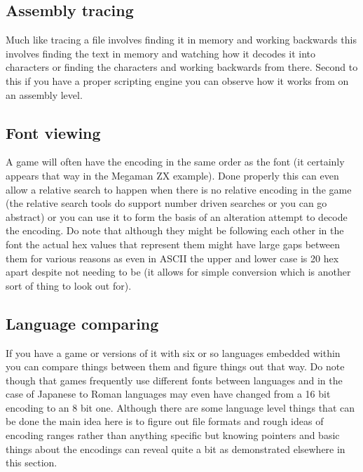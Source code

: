 \documentclass[
]{book}
\begin{document}
\hypertarget{assembly-tracing}{%
\subsection{Assembly tracing}\label{assembly-tracing}}

Much like tracing a file involves finding it in memory and working backwards this involves finding the text in memory and watching how it decodes it into characters or finding the characters and working backwards from there. Second to this if you have a proper scripting engine you can observe how it works from on an assembly level.

\hypertarget{font-viewing}{%
\subsection{Font viewing}\label{font-viewing}}

A game will often have the encoding in the same order as the font (it certainly appears that way in the Megaman ZX example). Done properly this can even allow a relative search to happen when there is no relative encoding in the game (the relative search tools do support number driven searches or you can go abstract) or you can use it to form the basis of an alteration attempt to decode the encoding. Do note that although they might be following each other in the font the actual hex values that represent them might have large gaps between them for various reasons as even in ASCII the upper and lower case is 20 hex apart despite not needing to be (it allows for simple conversion which is another sort of thing to look out for).

\hypertarget{language-comparing}{%
\subsection{Language comparing}\label{language-comparing}}

If you have a game or versions of it with six or so languages embedded within you can compare things between them and figure things out that way. Do note though that games frequently use different fonts between languages and in the case of Japanese to Roman languages may even have changed from a 16 bit encoding to an 8 bit one. Although there are some language level things that can be done the main idea here is to figure out file formats and rough ideas of encoding ranges rather than anything specific but knowing pointers and basic things about the encodings can reveal quite a bit as demonstrated elsewhere in this section.
\end{document}

